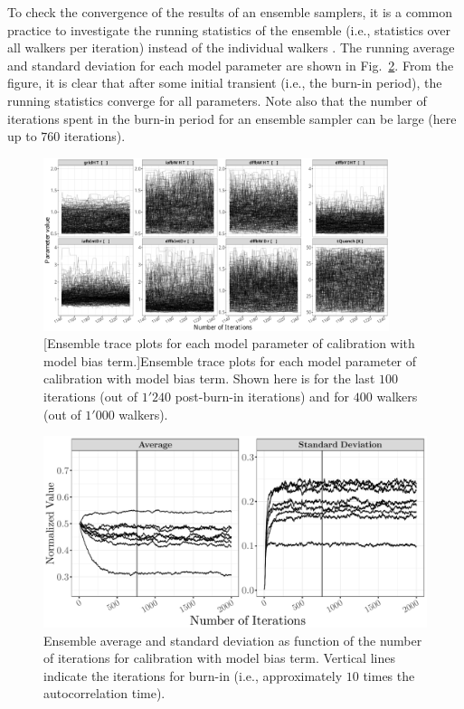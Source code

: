 To check the convergence of the results of an ensemble samplers, it is a common practice to investigate the running statistics of the ensemble (i.e., statistics over all walkers per iteration) instead of the individual walkers \cite{Foreman-Mackey2013,Akeret2013}.
The running average and standard deviation for each model parameter are shown in Fig.~\ref{fig:ch5_plot_ens_stat_mcmc}.
From the figure, it is clear that after some initial transient (i.e., the burn-in period), the running statistics converge for all parameters.
Note also that the number of iterations spent in the burn-in period for an ensemble sampler can be large (here up to $760$ iterations).
\begin{figure}
	\centering
	\includegraphics[width=0.90\textwidth]{../figures/chapter5/figures/plotEnsTraceDiscAllCentered}
		[Ensemble trace plots for each model parameter of calibration with model bias term.]{Ensemble trace plots for each model parameter of calibration with model bias term. Shown here is for the last $100$ iterations (out of $1'240$ post-burn-in iterations) and for $400$ walkers (out of $1'000$ walkers).}
	\label{fig:ch5_plot_ens_trace_all_disc_centered}
\end{figure}
\clearpage

\begin{figure}[!bth]
    \centering
    \includegraphics[width=1.0\textwidth]{../figures/chapter5/figures/plotEnsStatMCMC}
    \caption[Ensemble average and standard deviation as function of the number of iterations for calibration with model bias term.]{Ensemble average and standard deviation as function of the number of iterations for calibration with model bias term. Vertical lines indicate the iterations for burn-in (i.e., approximately $10$ times the autocorrelation time).}
    \label{fig:ch5_plot_ens_stat_mcmc}
\end{figure}

